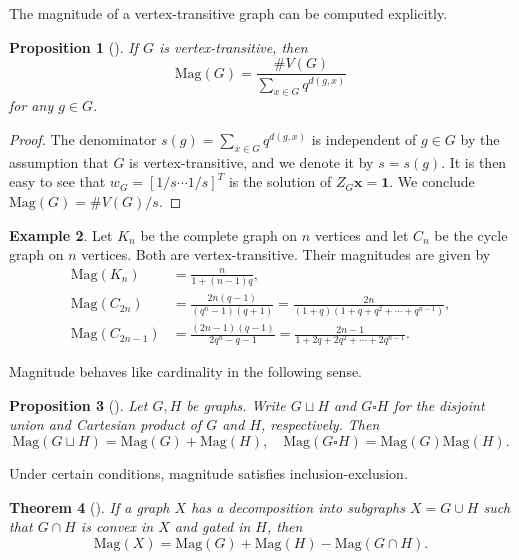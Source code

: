 \documentclass{amsart}
\numberwithin{equation}{section}
\newtheorem{thm}{Theorem}[section]
\newtheorem{prop}[thm]{Proposition}
\theoremstyle{plain}
\theoremstyle{remark}
\theoremstyle{definition}
\newtheorem{ex}[thm]{Example}
\numberwithin{equation}{section}
\newcommand{\Mag}{\mathrm{Mag}}
\begin{document}
The magnitude of a vertex-transitive graph can be computed explicitly.
\begin{prop}[{\cite[Lemma 3.2]{Leinster2019}}]\label{vert-trans}
    If $G$ is vertex-transitive, then
    \[
    \Mag(G)=\frac{\#V(G)}{\sum_{x\in G}q^{d(g,x)}}
    \]
    for any $g\in G$.
\end{prop}

\begin{proof}
    The denominator $s(g)=\sum_{x\in G}q^{d(g,x)}$ is independent of $g\in G$ by the assumption that $G$ is vertex-transitive, and we denote it by $s=s(g)$. 
    It is then easy to see that $w_G=[1/s \cdots 1/s]^T$ is the solution of $Z_G\mathbf{x}=\mathbf{1}$. 
    We conclude $\Mag(G)=\#V(G)/s$.
\end{proof}


\begin{ex}
    Let $K_n$ be the complete graph on $n$ vertices and let $C_n$ be the cycle graph on $n$ vertices. Both are vertex-transitive.
    Their magnitudes are given by
    \begin{align*}
        \Mag(K_n)&=\frac{n}{1+(n-1)q},\\
        \Mag(C_{2n})&=\frac{2n(q-1)}{(q^n-1)(q+1)}=\frac{2n}{(1+q)(1+q+q^2+\cdots+q^{n-1})},\\
        \Mag(C_{2n-1})&=\frac{(2n-1)(q-1)}{2q^n-q-1}=\frac{2n-1}{1+2q+2q^2+\cdots+2q^{n-1}}.
    \end{align*}
\end{ex}

Magnitude behaves like cardinality in the following sense.
\begin{prop}[{\cite[Lemmas 3.5 and 3.6]{Leinster2019}}]\label{magprod}
    Let $G, H$ be graphs. Write $G\sqcup H$ and $G\square H$ for the disjoint union and Cartesian product of $G$ and $H$, respectively. Then
    \[
    \Mag(G\sqcup H)=\Mag(G)+\Mag(H),\quad \Mag(G\square H)=\Mag(G)\Mag(H).
    \]
\end{prop}


Under certain conditions, magnitude satisfies inclusion-exclusion.
\begin{thm}[{\cite[Theorem 4.9]{Leinster2019}}]
    If a graph $X$ has a decomposition into subgraphs $X=G\cup H$ such that $G\cap H$ is convex in $X$ and gated in $H$, then
    \[
    \Mag(X)=\Mag(G)+\Mag(H)-\Mag(G\cap H).
    \]
\end{thm}
\end{document}
